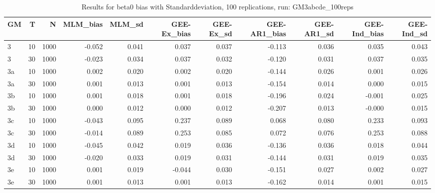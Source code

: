 \begin{table}[ht]
\centering
\begin{tabular}{lrrrrrrrrrr}
  \hline
GM & T & N & MLM\_bias & MLM\_sd & GEE-Ex\_bias & GEE-Ex\_sd & GEE-AR1\_bias & GEE-AR1\_sd & GEE-Ind\_bias & GEE-Ind\_sd \\ 
  \hline
3 & 10 & 1000 & -0.052 & 0.041 & 0.037 & 0.037 & -0.113 & 0.036 & 0.035 & 0.043 \\ 
  3 & 30 & 1000 & -0.023 & 0.034 & 0.037 & 0.032 & -0.120 & 0.031 & 0.037 & 0.035 \\ 
  3a & 10 & 1000 & 0.002 & 0.020 & 0.002 & 0.020 & -0.144 & 0.026 & 0.001 & 0.026 \\ 
  3a & 30 & 1000 & 0.001 & 0.013 & 0.001 & 0.013 & -0.154 & 0.014 & 0.000 & 0.015 \\ 
  3b & 10 & 1000 & 0.001 & 0.018 & 0.001 & 0.018 & -0.196 & 0.024 & -0.001 & 0.025 \\ 
  3b & 30 & 1000 & 0.000 & 0.012 & 0.000 & 0.012 & -0.207 & 0.013 & -0.000 & 0.015 \\ 
   \hline
3c & 10 & 1000 & -0.043 & 0.095 & 0.237 & 0.089 & 0.068 & 0.080 & 0.233 & 0.093 \\ 
  3c & 30 & 1000 & -0.014 & 0.089 & 0.253 & 0.085 & 0.072 & 0.076 & 0.253 & 0.088 \\ 
  3d & 10 & 1000 & -0.045 & 0.042 & 0.019 & 0.036 & -0.136 & 0.036 & 0.018 & 0.044 \\ 
  3d & 30 & 1000 & -0.020 & 0.033 & 0.019 & 0.031 & -0.144 & 0.031 & 0.019 & 0.035 \\ 
  3e & 10 & 1000 & 0.001 & 0.019 & -0.044 & 0.030 & -0.151 & 0.027 & 0.002 & 0.027 \\ 
  3e & 30 & 1000 & 0.001 & 0.013 & 0.001 & 0.013 & -0.162 & 0.014 & 0.001 & 0.015 \\ 
   \hline
\end{tabular}
\caption{Results for beta0 bias with Standarddeviation, 100 replications, run: GM3abcde_100reps} 
\label{tab:beta0_bias_sd}
\end{table}
